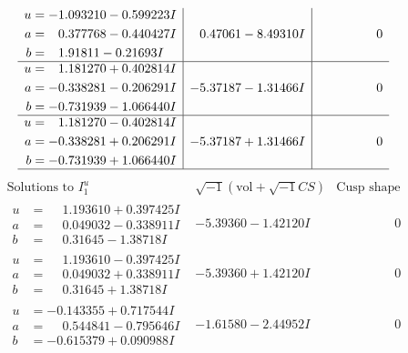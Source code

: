 \documentclass[1p]{elsarticle_modified}
\theoremstyle{definition}
\newcommand{\I}{\sqrt{-1}}
\begin{document}
$$\begin{array}{c|c|c}
\begin{aligned}
u &= -1.093210 - 0.599223 I \\
a &= \phantom{-}0.377768 - 0.440427 I \\
b &= \phantom{-}1.91811 - 0.21693 I\end{aligned}
 & \phantom{-}0.47061 - 8.49310 I & \phantom{-0.000000 } 0 \\ \hline\begin{aligned}
u &= \phantom{-}1.181270 + 0.402814 I \\
a &= -0.338281 - 0.206291 I \\
b &= -0.731939 - 1.066440 I\end{aligned}
 & -5.37187 - 1.31466 I & \phantom{-0.000000 } 0 \\ \hline\begin{aligned}
u &= \phantom{-}1.181270 - 0.402814 I \\
a &= -0.338281 + 0.206291 I \\
b &= -0.731939 + 1.066440 I\end{aligned}
 & -5.37187 + 1.31466 I & \phantom{-0.000000 } 0\\
 \hline 
 \end{array}$$\newpage$$\begin{array}{c|c|c}  
\text{Solutions to }I^u_{1}& \I (\text{vol} + \sqrt{-1}CS) & \text{Cusp shape}\\
 \hline 
\begin{aligned}
u &= \phantom{-}1.193610 + 0.397425 I \\
a &= \phantom{-}0.049032 - 0.338911 I \\
b &= \phantom{-}0.31645 - 1.38718 I\end{aligned}
 & -5.39360 - 1.42120 I & \phantom{-0.000000 } 0 \\ \hline\begin{aligned}
u &= \phantom{-}1.193610 - 0.397425 I \\
a &= \phantom{-}0.049032 + 0.338911 I \\
b &= \phantom{-}0.31645 + 1.38718 I\end{aligned}
 & -5.39360 + 1.42120 I & \phantom{-0.000000 } 0 \\ \hline\begin{aligned}
u &= -0.143355 + 0.717544 I \\
a &= \phantom{-}0.544841 - 0.795646 I \\
b &= -0.615379 + 0.090988 I\end{aligned}
 & -1.61580 - 2.44952 I & \phantom{-0.000000 } 0 \\ \hline\begin{aligned}

\end{aligned}
\end{array}$$
\end{document}
